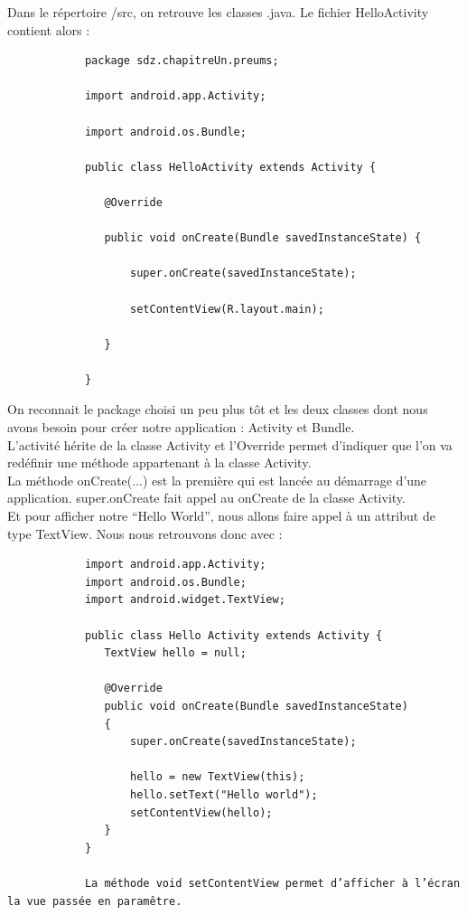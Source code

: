 \documentclass[a4paper]{report}
\begin{document}
			Dans le répertoire /src, on retrouve les classes .java. Le fichier HelloActivity contient alors :\\
			\begin{verbatim}
			package sdz.chapitreUn.preums;

			import android.app.Activity;

			import android.os.Bundle;

			public class HelloActivity extends Activity {

			   @Override

			   public void onCreate(Bundle savedInstanceState) {

			       super.onCreate(savedInstanceState);

			       setContentView(R.layout.main);

			   }

			}
			\end{verbatim}
			On reconnait le package choisi un peu plus tôt et les deux classes dont nous avons besoin pour créer notre application : Activity et Bundle.\\

			L’activité hérite de la classe Activity et l’Override permet d’indiquer que l’on va redéfinir une méthode appartenant à la classe Activity.\\

			La méthode onCreate(...) est la première qui est lancée au démarrage d'une application. super.onCreate fait appel au onCreate de la classe Activity.\\

			Et pour afficher notre “Hello World”, nous allons faire appel à un attribut de type TextView. Nous nous retrouvons donc avec :\\
			\begin{verbatim}
			import android.app.Activity;
			import android.os.Bundle;
			import android.widget.TextView;

			public class Hello Activity extends Activity {
			   TextView hello = null;

			   @Override
			   public void onCreate(Bundle savedInstanceState)
			   {
			       super.onCreate(savedInstanceState);
			       
			       hello = new TextView(this);
			       hello.setText("Hello world");
			       setContentView(hello);
			   }
			}

			La méthode void setContentView permet d’afficher à l’écran la vue passée en paramêtre. 
			\end{verbatim}
\end{document}
